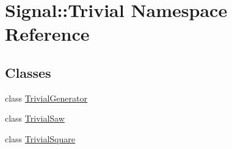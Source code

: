 \hypertarget{namespaceSignal_1_1Trivial}{\section{Signal\+:\+:Trivial Namespace Reference}
\label{namespaceSignal_1_1Trivial}
}
\subsection*{Classes}
\begin{DoxyCompactItemize}
\item 
class \hyperlink{classSignal_1_1Trivial_1_1TrivialGenerator}{Trivial\+Generator}
\item 
class \hyperlink{classSignal_1_1Trivial_1_1TrivialSaw}{Trivial\+Saw}
\item 
class \hyperlink{classSignal_1_1Trivial_1_1TrivialSquare}{Trivial\+Square}
\end{DoxyCompactItemize}
